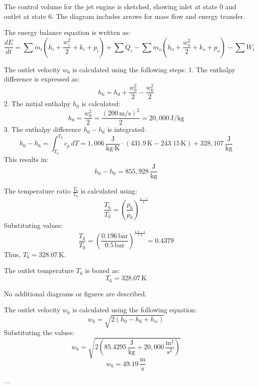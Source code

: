 The control volume for the jet engine is sketched, showing inlet at state 0 and outlet at state 6. The diagram includes arrows for mass flow and energy transfer.  

The energy balance equation is written as:  
\[
\frac{dE}{dt} = \sum \dot{m}_i \left( h_i + \frac{w_i^2}{2} + k_i + p_i \right) + \sum \dot{Q}_i - \sum \dot{m}_o \left( h_o + \frac{w_o^2}{2} + k_o + p_o \right) - \sum \dot{W}_i
\]

The outlet velocity \( w_6 \) is calculated using the following steps:  
1. The enthalpy difference is expressed as:  
\[
h_6 = h_0 + \frac{w_0^2}{2} - \frac{w_6^2}{2}
\]  
2. The initial enthalpy \( h_0 \) is calculated:  
\[
h_0 = \frac{w_0^2}{2} = \frac{(200 \, \text{m/s})^2}{2} = 20,000 \, \text{J/kg}
\]  
3. The enthalpy difference \( h_0 - h_6 \) is integrated:  
\[
h_0 - h_6 = \int_{T_0}^{T_6} c_p \, dT = 1,006 \, \frac{\text{J}}{\text{kg·K}} \cdot (431.9 \, \text{K} - 243.15 \, \text{K}) + 328,107 \, \frac{\text{J}}{\text{kg}}
\]  
This results in:  
\[
h_0 - h_6 = 855,928 \, \frac{\text{J}}{\text{kg}}
\]

The temperature ratio \( \frac{T_6}{T_0} \) is calculated using:  
\[
\frac{T_6}{T_0} = \left( \frac{p_6}{p_0} \right)^{\frac{\kappa - 1}{\kappa}}
\]  
Substituting values:  
\[
\frac{T_6}{T_0} = \left( \frac{0.196 \, \text{bar}}{0.5 \, \text{bar}} \right)^{\frac{1.4 - 1}{1.4}} = 0.4379
\]  
Thus, \( T_6 = 328.07 \, \text{K} \).  

The outlet temperature \( T_6 \) is boxed as:  
\[
T_6 = 328.07 \, \text{K}
\]  

No additional diagrams or figures are described.

The outlet velocity \( w_6 \) is calculated using the following equation:  
\[
w_6 = \sqrt{2 \left( h_0 - h_6 + h_w \right)}
\]  
Substituting the values:  
\[
w_6 = \sqrt{2 \left( 85.4295 \, \frac{\text{J}}{\text{kg}} + 20,000 \, \frac{\text{m}^2}{\text{s}^2} \right)}
\]  
\[
w_6 = 49.19 \, \frac{\text{m}}{\text{s}}
\]  

---